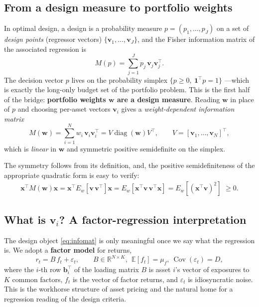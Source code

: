 \documentclass[11pt]{article}
\newcommand{\R}{\mathbb{R}}
\newcommand{\E}{\mathbb{E}}
\newcommand{\diag}{\operatorname{diag}}
\newcommand{\one}{\mathbf{1}}
\newcommand{\w}{\mathbf{w}}
\newcommand{\vv}{\mathbf{v}}
\newcommand{\bb}{\mathbf{b}}
\newcommand{\M}{M(\w)}
\begin{document}
\subsection{From a design measure to portfolio weights}
In optimal design, a design is a probability measure $p=(p_1,\dots,p_J)$ on a set
of \emph{design points} (regressor vectors) $\{\vv_1,\dots,\vv_J\}$, and the
Fisher information matrix of the associated regression is
\[
  M(p)=\sum_{j=1}^{J}p_j\,\vv_j\vv_j^\top .
\]
The decision vector $p$ lives on the probability simplex $\{p\ge0,\ \one^\top p=1\}$
---which is exactly the long-only budget set of the portfolio problem. This is the
first half of the bridge: \textbf{portfolio weights $\w$ are a design measure}.
Reading $\w$ in place of $p$ and choosing per-asset vectors $\vv_i$ gives a
\emph{weight-dependent information matrix}
\begin{equation}
  \M=\sum_{i=1}^{N} w_i\,\vv_i\vv_i^\top=V\diag(\w)V^\top,
  \qquad V=[\vv_1,\dots,\vv_N]^\top ,
  \label{eq:infomat}
\end{equation}
which is \emph{linear} in $\w$ and symmetric positive semidefinite on the simplex. 

The symmetry follows from its definition, and, the positive semidefiniteness 
of the appropriate quadratic form is easy to verify: 
\begin{eqnarray*}
\mathbf{x}^{\top} \M \mathbf{x} 
= \mathbf{x}^{\top}E_{w}[\mathbf{v}\,\mathbf{v}^{\top}]\mathbf{x} 
= E_{w}[\mathbf{x}^{\top}\mathbf{v}\,\mathbf{v}^{\top}\mathbf{x}] 
= E_{w}[(\mathbf{x}^{\top}\mathbf{v})^{2}] \,\, \geq 0. \nonumber
\end{eqnarray*}



\subsection{What is $\vv_i$? A factor-regression interpretation}
\label{sec:vi}
The design object \eqref{eq:infomat} is only meaningful once we say what the
regression is. We adopt a \textbf{factor model} for returns,
\begin{equation}
  r_t = B\,f_t + \varepsilon_t,
  \qquad B\in\R^{N\times K},\ \
  \E[f_t]=\mu_f,\ \operatorname{Cov}(\varepsilon_t)=D,
  \label{eq:factor}
\end{equation}
where the $i$-th row $\bb_i^\top$ of the loading matrix $B$ is asset $i$'s vector
of exposures to $K$ common factors, $f_t$ is the vector of factor returns, and
$\varepsilon_t$ is idiosyncratic noise. This is the workhorse structure of asset
pricing \cite{fama1993} and the natural home for a regression reading of the
design criteria.
\end{document}
